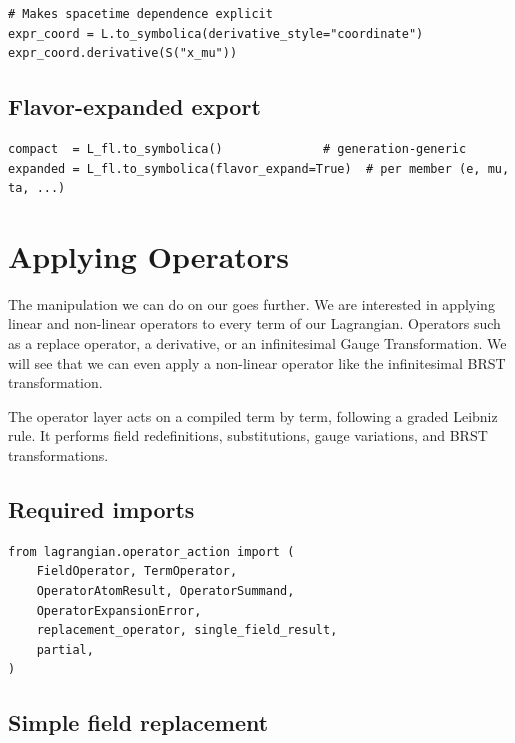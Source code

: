 \begin{verbatim}
# Makes spacetime dependence explicit
expr_coord = L.to_symbolica(derivative_style="coordinate")
expr_coord.derivative(S("x_mu"))
\end{verbatim}

\subsection*{Flavor-expanded export}

\begin{verbatim}
compact  = L_fl.to_symbolica()              # generation-generic
expanded = L_fl.to_symbolica(flavor_expand=True)  # per member (e, mu, ta, ...)
\end{verbatim}

\section{Applying Operators}
\label{sec:feynpy-apply-operator}

The manipulation we can do on our  goes further. We are interested in applying linear and non-linear operators to every term of our Lagrangian. Operators such as a replace operator, a derivative, or an infinitesimal Gauge Transformation. We will see that we can even apply a non-linear operator like the infinitesimal BRST transformation.

The operator layer acts on a compiled  term by term,
following a graded Leibniz rule. It performs field redefinitions,
substitutions, gauge variations, and BRST transformations.

\subsection*{Required imports}

\begin{verbatim}
from lagrangian.operator_action import (
    FieldOperator, TermOperator,
    OperatorAtomResult, OperatorSummand,
    OperatorExpansionError,
    replacement_operator, single_field_result,
    partial,
)
\end{verbatim}

\subsection*{Simple field replacement}


